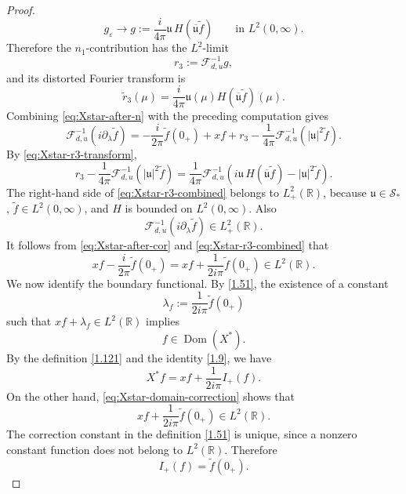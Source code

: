 \documentclass[10pt]{article}
\numberwithin{equation}{section}
\numberwithin{theorem}{section}
\begin{document}
\begin{proof}
\[
g_\varepsilon
\longrightarrow
g
:=
\frac{i}{4\pi}
\mathfrak u\,H(\overline{\mathfrak u}\widetilde f)
\qquad\text{in }L^2(0,\infty).
\]
Therefore the \(n_1\)-contribution has the \(L^2\)-limit
\[
r_3:=\mathcal F_{d,u}^{-1}g,
\]
and its distorted Fourier transform is
\begin{equation}
\label{eq:Xstar-r3-transform}
\widetilde r_3(\mu)
=
\frac{i}{4\pi}
\mathfrak u(\mu)
H(\overline{\mathfrak u}\widetilde f)(\mu).
\end{equation}
Combining \eqref{eq:Xstar-after-n} with the preceding computation gives
\begin{equation}
\label{eq:Xstar-after-cor}
\mathcal F_{d,u}^{-1}(i\partial_\lambda\widetilde f)
=
-\frac{i}{2\pi}\widetilde f(0_{+})
+
xf
+
r_3
-
\frac1{4\pi}
\mathcal F_{d,u}^{-1}\left(|\mathfrak u|^2\widetilde f\right).
\end{equation}
By \eqref{eq:Xstar-r3-transform},
\begin{equation}
\label{eq:Xstar-r3-combined}
r_3
-
\frac1{4\pi}
\mathcal F_{d,u}^{-1}\left(|\mathfrak u|^2\widetilde f\right)
=
\frac1{4\pi}
\mathcal F_{d,u}^{-1}
\left(
i\mathfrak u\,H(\overline{\mathfrak u}\widetilde f)
-
|\mathfrak u|^2\widetilde f
\right).
\end{equation}
The right-hand side of \eqref{eq:Xstar-r3-combined} belongs to \(L^2_+(\mathbb R)\),
because \(\mathfrak u\in\mathcal S_*\), \(\widetilde f\in L^2(0,\infty)\), and \(H\) is
bounded on \(L^2(0,\infty)\). Also
\[
\mathcal F_{d,u}^{-1}(i\partial_\lambda\widetilde f)\in L^2_+(\mathbb R).
\]
It follows from \eqref{eq:Xstar-after-cor} and \eqref{eq:Xstar-r3-combined} that
\begin{equation}
\label{eq:Xstar-domain-correction}
xf-\frac{i}{2\pi}\widetilde f(0_+)
=
xf+\frac1{2i\pi}\widetilde f(0_+)
\in L^2(\mathbb R).
\end{equation}
We now identify the boundary functional. By \eqref{1.51}, the existence of a constant
\[
\lambda_f:=\frac1{2i\pi}\widetilde f(0_+)
\]
such that \(xf+\lambda_f\in L^2(\mathbb R)\) implies
\[
f\in\operatorname{Dom}(X^*).
\]
By the definition \eqref{1.121} and the identity \eqref{1.9}, we have
\[
X^*f
=
xf+\frac1{2i\pi}I_+(f).
\]
On the other hand, \eqref{eq:Xstar-domain-correction} shows that
\[
xf+\frac1{2i\pi}\widetilde f(0_+)\in L^2(\mathbb R).
\]
The correction constant in the definition \eqref{1.51} is unique, since a nonzero
constant function does not belong to \(L^2(\mathbb R)\). Therefore
\begin{equation}
\label{eq:Xstar-boundary-test}
I_+(f)=\widetilde f(0_+).

\end{equation}
\end{proof}
\end{document}

